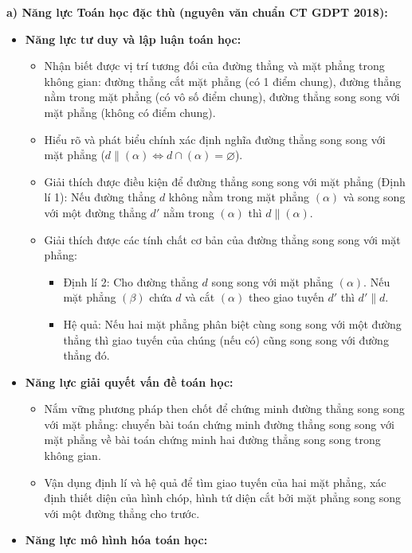 \documentclass[12pt, a4paper]{article}
\begin{document}
\textbf{a) Năng lực Toán học đặc thù (nguyên văn chuẩn CT GDPT 2018):}
\begin{itemize}[leftmargin=1.5em]
    \item \textbf{Năng lực tư duy và lập luận toán học:}
    \begin{itemize}
        \item Nhận biết được vị trí tương đối của đường thẳng và mặt phẳng trong không gian: đường thẳng cắt mặt phẳng (có 1 điểm chung), đường thẳng nằm trong mặt phẳng (có vô số điểm chung), đường thẳng song song với mặt phẳng (không có điểm chung).
        \item Hiểu rõ và phát biểu chính xác định nghĩa đường thẳng song song với mặt phẳng ($d \parallel (\alpha) \iff d \cap (\alpha) = \varnothing$).
        \item Giải thích được điều kiện để đường thẳng song song với mặt phẳng (Định lí 1): Nếu đường thẳng $d$ không nằm trong mặt phẳng $(\alpha)$ và song song với một đường thẳng $d'$ nằm trong $(\alpha)$ thì $d \parallel (\alpha)$.
        \item Giải thích được các tính chất cơ bản của đường thẳng song song với mặt phẳng:
        \begin{itemize}
            \item Định lí 2: Cho đường thẳng $d$ song song với mặt phẳng $(\alpha)$. Nếu mặt phẳng $(\beta)$ chứa $d$ và cắt $(\alpha)$ theo giao tuyến $d'$ thì $d' \parallel d$.
            \item Hệ quả: Nếu hai mặt phẳng phân biệt cùng song song với một đường thẳng thì giao tuyến của chúng (nếu có) cũng song song với đường thẳng đó.
        \end{itemize}
    \end{itemize}
    \item \textbf{Năng lực giải quyết vấn đề toán học:}
    \begin{itemize}
        \item Nắm vững phương pháp then chốt để chứng minh đường thẳng song song với mặt phẳng: chuyển bài toán chứng minh đường thẳng song song với mặt phẳng về bài toán chứng minh hai đường thẳng song song trong không gian.
        \item Vận dụng định lí và hệ quả để tìm giao tuyến của hai mặt phẳng, xác định thiết diện của hình chóp, hình tứ diện cắt bởi mặt phẳng song song với một đường thẳng cho trước.
    \end{itemize}
    \item \textbf{Năng lực mô hình hóa toán học:}
    \begin{itemize}

\end{itemize}
\end{itemize}
\end{document}
